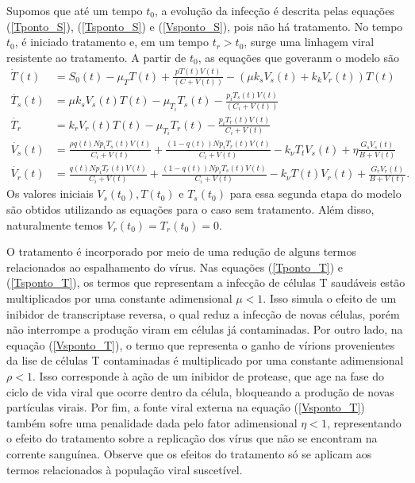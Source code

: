 Supomos que até um tempo \( t_{ 0 } \), a evolução da infecção é descrita pelas equações (\ref{Tponto_S}), (\ref{Tsponto_S}) e (\ref{Vsponto_S}), pois não há tratamento.
No tempo \( t_{ 0 } \), é iniciado tratamento e, em um tempo \( t_{ r } > t_{ 0 } \), surge uma linhagem viral resistente ao tratamento.
A partir de \( t_{ 0 } \), as equações que goveranm o modelo são
\begin{align}
    \dot{T}( t ) &= S_{ 0 } ( t ) - \mu_{ T } T ( t ) + \frac{ p T ( t ) V ( t ) }{ ( C + V ( t ) ) } - ( \mu k_{ s } V_{ s } ( t ) + k_{ k } V_{ r } ( t ) ) T ( t ) \label{Tponto_T}\\
    \dot{T_{ s }} ( t ) &= \mu k_{ s } V_{ s } ( t ) T ( t ) - \mu_{ T_{ i } } T_{ s } ( t ) - \frac{ p_{ i } T_{ s } ( t ) V ( t ) }{ ( C_{ i } + V ( t ) ) } \label{Tsponto_T} \\
    \dot{ T_{ r } } &= k_{ r } V_{ r } ( t ) T ( t ) - \mu_{ T_{ i } } T_{ r } ( t ) - \frac{ p_{ i } T_{ r } ( t ) V ( t ) }{ C_{ i } + V ( t ) } \label{Trponto_T} \\
    \dot{V_{ s } } ( t ) &= \frac{ \rho q ( t ) N p_{ i } T_{ s } ( t ) V ( t ) }{ C_{ i } + V ( t ) } + \frac{ ( 1 - q ( t ) ) N p_{ i } T_{ r } ( t ) V ( t ) }{ C_{ i } + V ( t ) } - k_{ \nu } T_{ t } V_{ s } ( t ) + \eta \frac{ G_{ s } V_{ s } ( t ) }{ B + V ( t ) } \label{Vsponto_T} \\
    \dot{ V_{ r }} ( t ) &= \frac{ q ( t ) N p_{ i } T_{ r } ( t ) V ( t ) }{ C_{ i } + V ( t ) } + \frac{ ( 1 - q ( t ) ) N p_{ i } T_{ s } ( t ) V ( t ) }{ C_{ i } + V ( t ) } - k_{ \nu } T ( t ) V_{ r } ( t ) + \frac{ G_{ r } V_{ r } ( t ) }{ B + V ( t ) } \label{Vrponto_T}
.\end{align}
Os valores iniciais \( V_{ s } ( t_{ 0 } ), T ( t_{ 0 } ) \) e \( T_{ s } ( t_{ 0 } ) \) para essa segunda etapa do modelo são obtidos utilizando as equações para o caso sem tratamento.
Além disso, naturalmente temos \( V_{ r } ( t_{ 0 } ) = T_{ r } ( t_{ 0 } ) = 0 \).

O tratamento é incorporado por meio de uma redução de alguns termos relacionados ao espalhamento do vírus.
Nas equações (\ref{Tponto_T}) e (\ref{Tsponto_T}), os termos que representam a infecção de células T saudáveis estão multiplicados por uma constante adimensional \( \mu < 1 \).
Isso simula o efeito de um inibidor de transcriptase reversa, o qual reduz a infecção de novas células, porém não interrompe a produção viram em células já contaminadas.
Por outro lado, na equação (\ref{Vsponto_T}), o termo que representa o ganho de vírions provenientes da lise de células T contaminadas é multiplicado por uma constante adimensional \( \rho < 1 \).
Isso corresponde à ação de um inibidor de protease, que age na fase do ciclo de vida viral que ocorre dentro da célula, bloqueando a produção de novas partículas virais.
Por fim, a fonte viral externa na equação (\ref{Vsponto_T}) também sofre uma penalidade dada pelo fator adimensional \( \eta < 1 \), representando o efeito do tratamento sobre a replicação dos vírus que não se encontram na corrente sanguínea.
Observe que os efeitos do tratamento só se aplicam aos termos relacionados à população viral suscetível.

